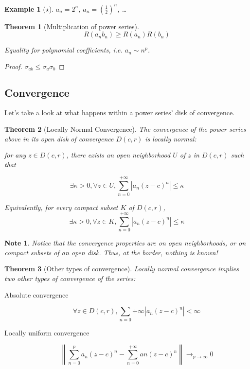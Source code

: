 \documentclass{article}
\newtheorem*{note}{Note}
\newtheorem*{example}{Example}
\newtheorem*{thm*}{Theorem}
\begin{document}
\begin{example}
    [$\star$]
    $a_n = 2^n$, $a_n = \left(\frac{1}{2}\right)^n$, \dots
\end{example}

\begin{thm*}
    [Multiplication of power series]
    $$R(a_nb_n) \geq R(a_n)R(b_n)$$

    Equality for polynomial coefficients, i.e. $a_n \sim n^p$.
\end{thm*}
\begin{proof}
    $\sigma_{ab} \leq \sigma_a\sigma_b$
\end{proof}

\subsection{Convergence}
Let's take a look at what happens within a power series' disk of convergence.

\begin{thm*}
    [Locally Normal Convergence]
    The convergence of the power series above in its open disk of convergence $D(c, r)$ is locally normal:
    
    for any $z\in D(c,r)$, there exists an open neighborhood $U$ of $z$ in $D(c, r)$ such that

    $$\exists \kappa > 0, \forall z \in U, \sum_{n=0}^{+\infty}|a_n(z-c)^n| \leq \kappa$$


    Equivalently, for every compact subset $K$ of $D(c,r)$,
    $$\exists \kappa > 0, \forall z \in K, \sum_{n=0}^{+\infty}|a_n(z-c)^n| \leq \kappa$$

\end{thm*}

\begin{note}
    Notice that the convergence properties are on open neighborhoods, or on compact subsets of an open disk. Thus, at the border, nothing is known!
\end{note}
    
\begin{thm*}
    [Other types of convergence]
    Locally normal convergence implies two other types of convergence of the series:

    \begin{description}
        \item[Absolute convergence] 
        $$\forall z \in D(c,r), \sum_{n=0}{+\infty}|a_n(z-c)^n| < \infty$$
        \item[Locally uniform convergence] 
            $$\left\|\sum_{n=0}^{p}a_n(z-c)^n - \sum_{n=0}^{+\infty}an(z-c)^n\right\|\rightarrow_{p\rightarrow\infty} 0$$
    \end{description}
\end{thm*}
\end{document}
